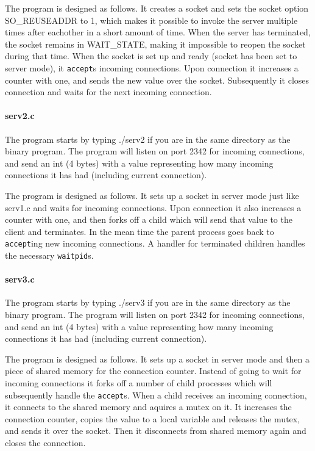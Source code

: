 \documentclass[a4paper,10pt]{article}
\begin{document}
The program is designed as follows. It creates a socket and sets the socket option SO\_REUSEADDR to 1, which makes it possible to invoke the server multiple times after eachother in a short amount of time. When the server has terminated, the socket remains in WAIT\_STATE, making it impossible to reopen the socket during that time. When the socket is set up and ready (socket has been set to server mode), it \texttt{accept}s incoming connections. Upon connection it increases a counter with one, and sends the new value over the socket. Subsequently it closes connection and waits for the next incoming connection.

\paragraph{serv2.c}
The program starts by typing ./serv2 if you are in the same directory as the binary program. The program will listen on port 2342 for incoming connections, and send an int (4 bytes) with a value representing how many incoming connections it has had (including current connection).

The program is designed as follows. It sets up a socket in server mode just like serv1.c and waits for incoming connections. Upon connection it also increases a counter with one, and then forks off a child which will send that value to the client and terminates. In the mean time the parent process goes back to \texttt{accept}ing new incoming connections. A handler for terminated children handles the necessary \texttt{waitpid}s.

\paragraph{serv3.c} The program starts by typing ./serv3 if you are in the same directory as the binary program. The program will listen on port 2342 for incoming connections, and send an int (4 bytes) with a value representing how many incoming connections it has had (including current connection).

The program is designed as follows. It sets up a socket in server mode and then a piece of shared memory for the connection counter. Instead of going to wait for incoming connections it forks off a number of child processes which will subsequently handle the \texttt{accept}s. When a child receives an incoming connection, it connects to the shared memory and aquires a mutex on it. It increases the connection counter, copies the value to a local variable and releases the mutex, and sends it over the socket. Then it disconnects from shared memory again and closes the connection.
\end{document}
